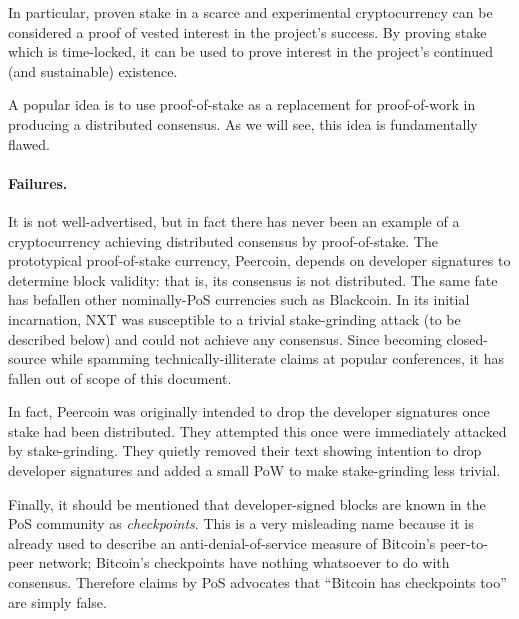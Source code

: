 \documentclass[letterpaper]{article}
\begin{document}
In particular, proven stake in a scarce and experimental cryptocurrency can be
considered a proof of vested interest in the project's success. By proving stake
which is time-locked, it can be used to prove interest in the project's continued
(and sustainable) existence.

A popular idea is to use proof-of-stake as a replacement for proof-of-work in
producing a distributed consensus. As we will see, this idea is fundamentally
flawed.

\paragraph{Failures.} It is not well-advertised, but in fact there has never
been an example of a cryptocurrency achieving distributed consensus by proof-of-stake.
The prototypical proof-of-stake currency, Peercoin, depends on developer signatures
to determine block validity: that is, its consensus is not distributed. The same
fate has befallen other nominally-PoS currencies such as Blackcoin. In its initial
incarnation, NXT was susceptible to a trivial stake-grinding attack (to be described
below) and could not achieve any consensus. Since becoming closed-source while spamming
technically-illiterate claims at popular conferences, it has fallen out of scope of
this document.

In fact, Peercoin was originally intended to drop the developer signatures once stake
had been distributed. They attempted this once were immediately attacked by stake-grinding.
They quietly removed their text showing intention to drop developer signatures and added
a small PoW to make stake-grinding less trivial.

Finally, it should be mentioned that developer-signed blocks are known in the PoS
community as \emph{checkpoints}. This is a very misleading name because it is already
used to describe an anti-denial-of-service measure of Bitcoin's peer-to-peer network;
Bitcoin's checkpoints have nothing whatsoever to do with consensus. Therefore claims
by PoS advocates that ``Bitcoin has checkpoints too'' are simply false.
\end{document}
